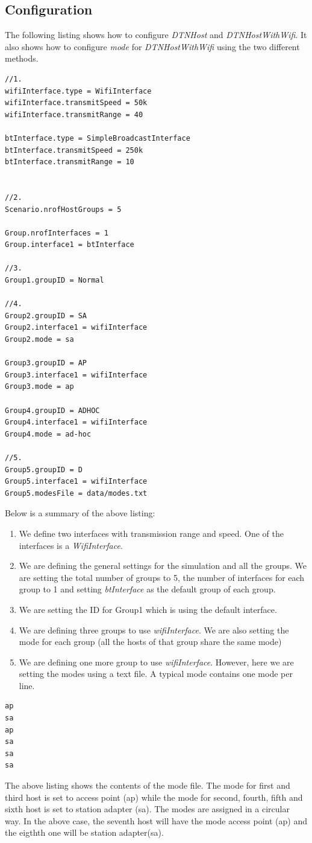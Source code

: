 \subsection{Configuration}
The following listing shows how to configure \textit{DTNHost} and \textit{DTNHostWithWifi}. It also shows how to configure \textit{mode} for \textit{DTNHostWithWifi} using the two different methods.

\begin{lstlisting}[language=bash]
//1.
wifiInterface.type = WifiInterface
wifiInterface.transmitSpeed = 50k
wifiInterface.transmitRange = 40

btInterface.type = SimpleBroadcastInterface
btInterface.transmitSpeed = 250k
btInterface.transmitRange = 10


//2.
Scenario.nrofHostGroups = 5

Group.nrofInterfaces = 1
Group.interface1 = btInterface

//3.
Group1.groupID = Normal

//4.
Group2.groupID = SA
Group2.interface1 = wifiInterface
Group2.mode = sa

Group3.groupID = AP
Group3.interface1 = wifiInterface
Group3.mode = ap

Group4.groupID = ADHOC
Group4.interface1 = wifiInterface
Group4.mode = ad-hoc

//5.
Group5.groupID = D
Group5.interface1 = wifiInterface
Group5.modesFile = data/modes.txt
\end{lstlisting}
Below is a summary of the above listing:
\begin{enumerate}
	\item We define two interfaces with transmission range and speed. One of the interfaces is a \textit{WifiInterface}.
	\item We are defining the general settings for the simulation and all the groups. We are setting the total number of groups to 5, the number of interfaces for each group to 1 and setting \textit{btInterface} as the default group of each group.
	\item We are setting the ID for Group1 which is using the default interface.
	\item We are defining three groups to use \textit{wifiInterface}. We are also setting the mode for each group (all the hosts of that group share the same mode)
	\item We are defining one more group to use \textit{wifiInterface}. However, here we are setting the modes using a text file. A typical mode contains one mode per line.
\end{enumerate}
\newpage
\begin{lstlisting}[language=bash]
ap
sa
ap
sa
sa
sa
\end{lstlisting}
\vspace{3mm}
The above listing shows the contents of the mode file. The mode for first and third host is set to access point (ap) while the mode for second, fourth, fifth and sixth host is set to station adapter (sa). The modes are assigned in a circular way. In the above case, the seventh host will have the mode access point (ap) and the eigthth one will be station adapter(sa).

